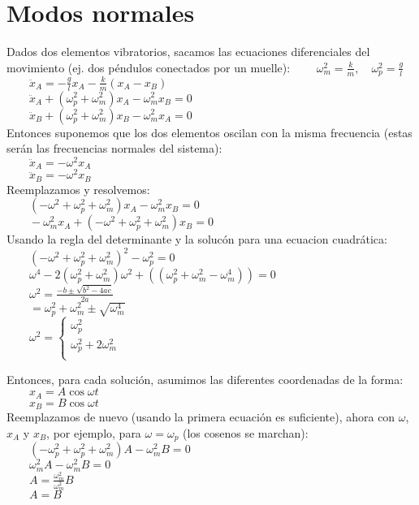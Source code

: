 \documentclass[a4paper,landscape,10pt]{cheatsheet}
\begin{document}
\section{Modos normales}
Dados dos elementos vibratorios, sacamos las ecuaciones diferenciales del movimiento (ej. dos péndulos conectados por un muelle):
$\qquad \omega_m^2=\frac{k}{m},\quad\omega_p^2=\frac{g}{l}$\\
$\qquad \ddot{x}_A=-\frac{g}{l}x_A-\frac{k}{m}(x_A-x_B)$\\
$\qquad \ddot{x}_A+(\omega_p^2+\omega_m^2)x_A-\omega_m^2x_B=0$\\
$\qquad \ddot{x}_B+(\omega_p^2+\omega_m^2)x_B-\omega_m^2x_A=0$\\
Entonces suponemos que los dos elementos oscilan con la misma
frecuencia (estas serán las frecuencias normales del sistema):\\
$\qquad\ddot{x}_A=-\omega^2 x_A$\\
$\qquad\ddot{x}_B=-\omega^2 x_B$\\
Reemplazamos y resolvemos:\\
$\qquad (-\omega^2+\omega_p^2+\omega_m^2)x_A-\omega_m^2x_B=0$\\
$\qquad -\omega_m^2x_A+(-\omega^2+\omega_p^2+\omega_m^2)x_B=0$\\
Usando la regla del determinante y la solucón para una ecuacion cuadrática:\\
$\qquad (-\omega^2+\omega_p^2+\omega_m^2)^2 - \omega_p^2=0$\\
$\qquad \omega^4-2(\omega_p^2+\omega_m^2)\omega^2 + ((\omega_p^2+\omega_m^2-\omega_m^4))=0$\\
$\qquad \omega^2=\frac{-b \pm \sqrt{b^2 - 4ac}}{2a}$\\
$\qquad =\omega_p^2+\omega_m^2 \pm \sqrt{\omega_m^4}$\\
$\qquad \omega^2=
  \begin{cases}
    \omega_p^2             \\
    \omega_p^2+2\omega_m^2 \\
  \end{cases}
$

Entonces, para cada solución, asumimos las diferentes coordenadas de la forma:\\
$\qquad x_A=A\cos\omega t$\\
$\qquad x_B=B\cos\omega t$\\

Reemplazamos de nuevo (usando la primera ecuación es suficiente), ahora con $\omega$,
$x_A$ y $x_B$, por ejemplo, para $\omega=\omega_p$ (los cosenos se marchan):\\
$\qquad (-\omega_p^2+\omega_p^2+\omega_m^2)A-\omega_m^2B=0$\\
$\qquad \omega_m^2A-\omega_m^2B=0$\\
$\qquad A=\frac{\omega_m^2}{\omega_m^2}B$\\
$\qquad A=B$\\
\end{document}
